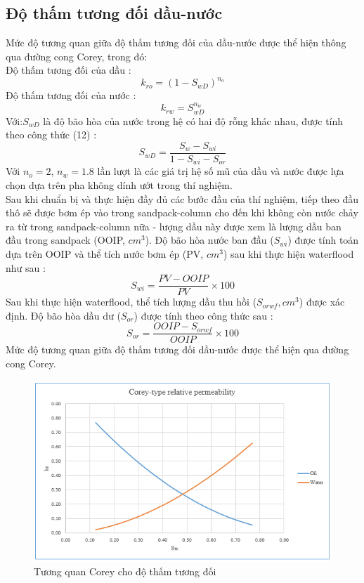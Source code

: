 \documentclass[12pt,a4paper]{article}
\begin{document}
	\subsection{Độ thấm tương đối dầu-nước}
	Mức độ tương quan giữa độ thấm tương đối của dầu-nước được thể hiện thông qua đường cong Corey, trong đó:\\
	Độ thấm tương đối của dầu \cite{guliyev2008simulation}:
		\begin{equation}
			k_{ro}=(1-S_{wD})^{n_o}
		\end{equation}
	Độ thấm tương đối của nước \cite{guliyev2008simulation}:
		\begin{equation}
			k_{rw}=S_{wD}^{n_w}
		\end{equation}
	Với:\hspace*{15pt}$S_{wD}$ là độ bão hòa của nước trong hệ có hai độ rỗng khác nhau, được tính theo công thức (12) \cite{guliyev2008simulation}:
		\begin{equation}
			S_{wD}=\frac{S_w-S_{wi}}{1-S_{wi}-S_{or}}
		\end{equation}
	Với $n_o=2$, $n_w=1.8$ lần lượt là các giá trị hệ số mũ của dầu và nước được lựa chọn dựa trên pha không dính ướt trong thí nghiệm.\\
	Sau khi chuẩn bị và thực hiện đầy đủ các bước đầu của thí nghiệm, tiếp theo đầu thô sẽ được bơm ép vào trong sandpack-column cho đến khi không còn nước chảy ra từ trong sandpack-column nữa - lượng dầu này được xem là lượng dầu ban đầu trong sandpack (OOIP, $cm^3$). Độ bão hòa nước ban đầu ($S_{wi}$) được tính toán dựa trên OOIP và thể tích nước bơm ép (PV, $cm^3$) sau khi thực hiện waterflood như sau \cite{pereira2014ionic}:
		\begin{equation}
			S_{wi}=\frac{PV-OOIP}{PV}\times{100}
		\end{equation}
	\newpage
	\noindent
	Sau khi thực hiện waterflood, thể tích lượng dầu thu hồi ($S_{orwf}, cm^3$) được xác định. Độ bão hòa dầu dư ($S_{or}$) được tính theo công thức sau \cite{pereira2014ionic}:
		\begin{equation}
		S_{or}=\frac{OOIP-S_{orwf}}{OOIP}\times{100}
		\end{equation}
	Mức độ tương quan giữa độ thấm tương đối dầu-nước được thể hiện qua đường cong Corey.
		\begin{figure}[h]
			\centering
			\includegraphics[scale=1]{Fig/Corey.PNG}
			\caption{Tương quan Corey cho độ thấm tương đối}
		\end{figure}
\end{document}
